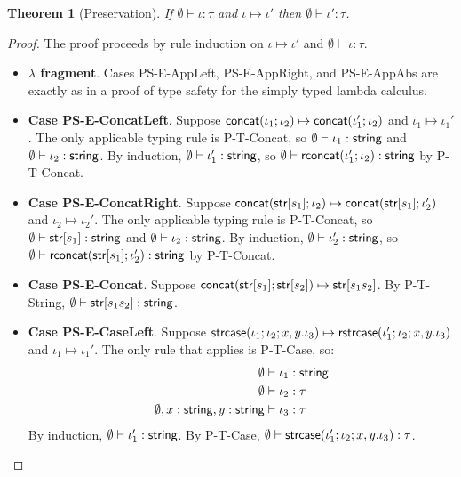 \documentclass[11pt,leqno]{article}
\newtheorem{thm}{Theorem}
\theoremstyle{definition}
\renewcommand{\tstr}[1]{{{\sf str}[#1]}}
\newcommand{\tconcat}[2]{{\sf concat}(#1;#2)} \newcommand{\concat}[2]{{\sf concat}(#1;#2)} %
\newcommand{\str}{{\sf string}}
\newcommand{\strcase}[3]{ {\sf rstrcase}(#1; #2; #3)}
\newcommand{\pstrcase}[3]{ {\sf strcase}(#1; #2; #3)}
\begin{document}
\begin{thm}[Preservation]
If $\emptyset \vdash \iota : \tau$ and $\iota \mapsto \iota'$ then $\emptyset \vdash \iota' : \tau$.
\end{thm}
\begin{proof}

The proof proceeds by rule induction on $\iota \mapsto \iota'$ and $\emptyset \vdash \iota : \tau$.

\begin{itemize}[label=$ $,itemsep=1ex]
\item \textbf{$\lambda$ fragment}. Cases PS-E-AppLeft, PS-E-AppRight, and PS-E-AppAbs are exactly as in a proof of type safety for
the simply typed lambda calculus.

\item \textbf{Case PS-E-ConcatLeft}.
Suppose $\tconcat{\iota_1}{\iota_2} \mapsto \tconcat{\iota_1'}{\iota_2}$ and $\iota_1 \mapsto \iota_1'$. The only applicable typing rule is P-T-Concat, so $\emptyset \vdash \iota_1 : \str$
and $\emptyset \vdash \iota_2 : \str$. 
By induction, $\emptyset \vdash \iota_1' : \str$,
so $\emptyset \vdash \rconcat{\iota_1'}{\iota_2} : \str$ by P-T-Concat.

\item \textbf{Case PS-E-ConcatRight}. Suppose $\tconcat{\tstr{s_1}}{\iota_2} \mapsto \tconcat{\tstr{s_1}}{\iota_2'}$ and $\iota_2 \mapsto \iota_2'$. The only applicable typing rule is P-T-Concat, so $\emptyset \vdash \tstr{s_1} : \str$
and $\emptyset \vdash \iota_2 : \str$. 
By induction, $\emptyset \vdash \iota_2' : \str$,
so $\emptyset \vdash \rconcat{\tstr{s_1}}{\iota_2'} : \str$ by P-T-Concat.

\item \textbf{Case PS-E-Concat}. Suppose $\tconcat{\tstr{s_1}}{\tstr{s_2}} \mapsto \tstr{s_1s_2}$. By P-T-String, $\emptyset \vdash \tstr{s_1s_2} : \str$.

\item \textbf{Case PS-E-CaseLeft}. Suppose $\pstrcase{\iota_1}{\iota_2}{x,y.\iota_3} \mapsto \strcase{\iota_1'}{\iota_2}{x,y.\iota_3}$ and $\iota_1 \mapsto \iota_1'$.
The only rule that applies is P-T-Case, so:
\begin{align*}
  \emptyset &\vdash \iota_1 : \str  \\
  \emptyset &\vdash \iota_2 : \tau \\
  \emptyset, x : \str, y : \str &\vdash \iota_3 : \tau 
\end{align*}
By induction, $\emptyset \vdash \iota_1' : \str$.
By P-T-Case, $\emptyset \vdash \pstrcase{\iota_1'}{\iota_2}{x,y.\iota_3} : \tau$.


\end{itemize}
\end{proof}
\end{document}
